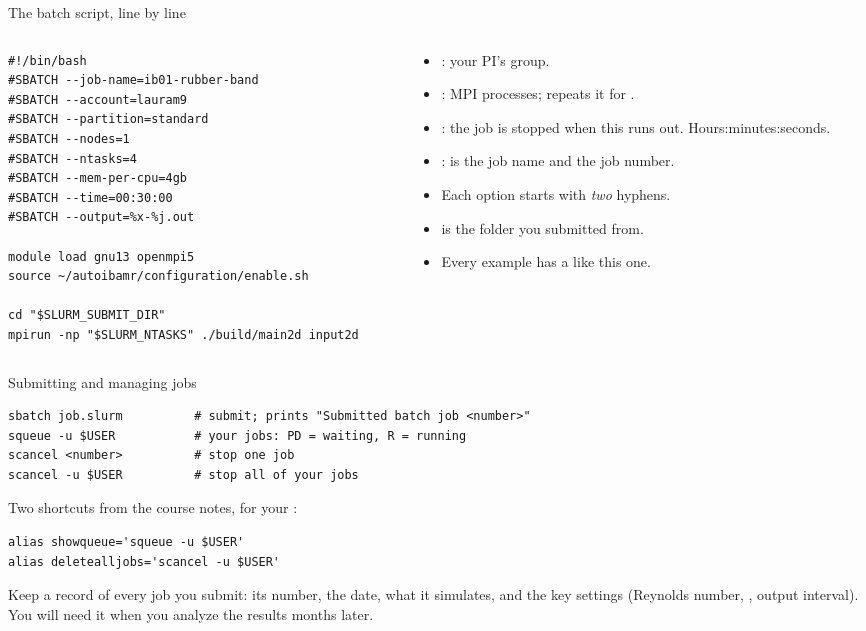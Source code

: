 \documentclass[aspectratio=169,11pt]{beamer}
\begin{document}
\begin{frame}[fragile]{The batch script, line by line}
\begin{columns}[T,onlytextwidth]
\begin{column}{0.52\textwidth}
\begin{lstlisting}[style=slurm]
#!/bin/bash
#SBATCH --job-name=ib01-rubber-band
#SBATCH --account=lauram9
#SBATCH --partition=standard
#SBATCH --nodes=1
#SBATCH --ntasks=4
#SBATCH --mem-per-cpu=4gb
#SBATCH --time=00:30:00
#SBATCH --output=%x-%j.out

module load gnu13 openmpi5
source ~/autoibamr/configuration/enable.sh

cd "$SLURM_SUBMIT_DIR"
mpirun -np "$SLURM_NTASKS" ./build/main2d input2d
\end{lstlisting}
\end{column}
\begin{column}{0.45\textwidth}
\begin{itemize}\scriptsize
  \item {}: your PI's group.
  \item {}: MPI processes;  repeats it for .
  \item {}: the job is stopped when this runs out. Hours:minutes:seconds.
  \item {}:  is the job name and  the job number.
  \item Each  option starts with \emph{two} hyphens.
  \item {} is the folder you submitted from.
  \item Every example has a  like this one.
\end{itemize}
\end{column}
\end{columns}
\end{frame}

\begin{frame}[fragile]{Submitting and managing jobs}
\begin{lstlisting}[style=shell]
sbatch job.slurm          # submit; prints "Submitted batch job <number>"
squeue -u $USER           # your jobs: PD = waiting, R = running
scancel <number>          # stop one job
scancel -u $USER          # stop all of your jobs
\end{lstlisting}
Two shortcuts from the course notes, for your :
\begin{lstlisting}[style=shell]
alias showqueue='squeue -u $USER'
alias deletealljobs='scancel -u $USER'
\end{lstlisting}
\begin{punchbox}
\small Keep a record of every job you submit: its number, the date, what it simulates, and the key settings (Reynolds number, , output interval). You will need it when you analyze the results months later.
\end{punchbox}
\end{frame}
\end{document}
